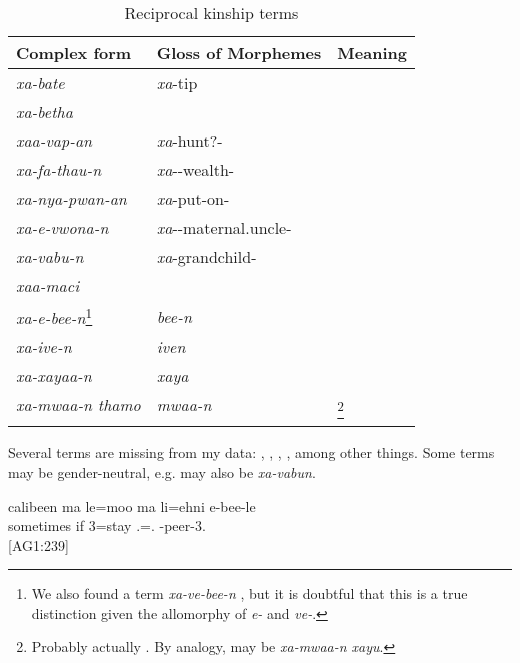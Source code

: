 \begin{table}
	\caption{Reciprocal kinship terms}
		\begin{tabularx}{\textwidth}{llQ}
		\lsptoprule
		Complex form & Gloss of Morphemes & Meaning\\\midrule
		\textit{xa-bate}& \textit{xa}-tip & 	
		\\ \textit{xa-betha} & &
		\\ \textit{xaa-vap-an} &\textit{xa}-hunt?-& 
		\\ \textit{xa-fa-thau-n} & \textit{xa}--wealth- &
		\\ \textit{xa-nya-pwan-an}& \textit{xa}-put-on- & 
		\\ \textit{xa-e-vwona-n}& \textit{xa}--maternal.uncle-& 
		\\ \textit{xa-vabu-n} &\textit{xa}-grandchild-& 
	\\	\textit{xaa-maci}& & 
	\\	\textit{xa-e-bee-n}\footnote{We also found a term \textit{xa-ve-bee-n} , but it is doubtful that this is a true distinction given the allomorphy of \textit{e-} and \textit{ve-}.}&\textit{bee-n} & 
	\\			\textit{xa-ive-n} &\textit{iven} & 
	\\			\textit{xa-xayaa-n}&\textit{xaya} &  \\
	\textit{xa-mwaa-n thamo}&\textit{mwaa-n} & \footnote{Probably actually . By analogy,  may be \textit{xa-mwaa-n xayu}.}\\
	\lspbottomrule
	\end{tabularx}
\label{tab:recp_rel}
\end{table}


Several terms are missing from my data: , , , , among other things. Some terms may be gender-neutral, e.g.  may also be \textit{xa-vabun}.


\ea \label{ex:rcp_rel}
\gll calibeen ma le=moo ma li=ehni e-bee-le\\ 
 sometimes if 3=stay  .=. -peer-3.\\ 
\glt {} {[AG1:239]}
\z



